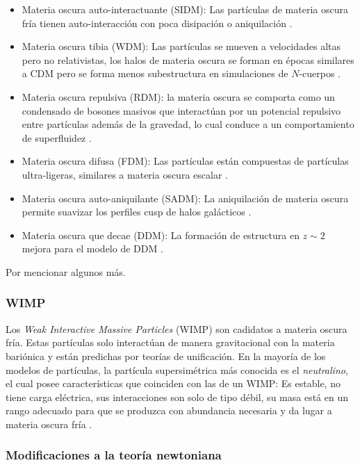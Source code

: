 \documentclass[a4paper,openright,12pt]{book}
\begin{document}
\begin{itemize}
\item Materia oscura auto-interactuante (SIDM): Las partículas de materia oscura fría tienen auto-interacción con poca disipación o aniquilación \cite{1.3.1}.
\item Materia oscura tibia (WDM): Las partículas se mueven a velocidades altas pero no relativistas, los halos de materia oscura se forman en épocas similares a CDM pero se forma menos subestructura en simulaciones de $N$-cuerpos \cite{1.3.2}.
\item Materia oscura repulsiva (RDM): la materia oscura se comporta como un condensado de bosones masivos que interactúan por un potencial repulsivo entre partículas además de la gravedad, lo cual conduce a un comportamiento de superfluidez \cite{1.3.3}.
\item Materia oscura difusa (FDM): Las partículas están compuestas de partículas ultra-ligeras, similares a materia oscura escalar \cite{1.3.4}.
\item Materia oscura auto-aniquilante (SADM): La aniquilación de materia oscura permite suavizar los perfiles cusp de halos galácticos \cite{1.3.5}.
\item Materia oscura que decae (DDM):  La formación de estructura en $z \sim 2$ mejora para el modelo de DDM \cite{1.3.6}.
\end{itemize}

Por mencionar algunos más.

\subsubsection*{WIMP}
Los \textit{Weak Interactive Massive Particles} (WIMP) son cadidatos a materia oscura fría. Estas partículas solo interactúan de manera gravitacional con la materia bariónica y están predichas por teorías de unificación. En la mayoría de los modelos de partículas, la partícula supersimétrica más conocida es el \textit{neutralino}, el cual posee  características que coinciden con las de un WIMP: Es estable, no tiene carga eléctrica, sus interacciones son solo de tipo débil, su masa está en un rango adecuado para que se produzca con abundancia necesaria y da lugar a materia oscura fría \cite{1.3.7}.

\subsubsection*{Modificaciones a la teoría newtoniana}
\end{document}
